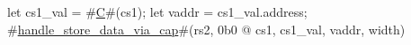 let cs1_val = #\hyperref[sailRISCVzC]{C}#(cs1);
let vaddr = cs1_val.address;
#\hyperref[sailRISCVzhandlezystorezydatazyviazycap]{handle\_store\_data\_via\_cap}#(rs2, 0b0 @ cs1, cs1_val, vaddr, width)

